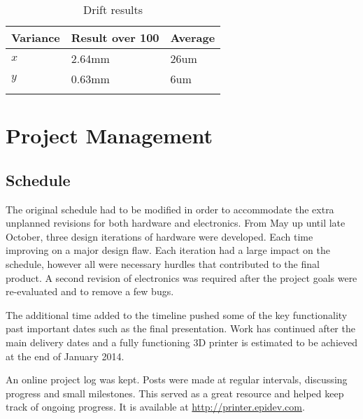 \documentclass[a4paper, 11pt, twoside]{Thesis}  %
\begin{document}
\begin{table}[!h]
\centering
\begin{tabulary}{\textwidth}{LLL}
\hline\hline
 Variance  &  Result over 100  &  Average \\
\hline
\hline
 $x$       &  2.64mm           &  26um    \\
 $y$       &  0.63mm           &  6um     \\
\\
\end{tabulary}
\caption{	Drift results}
\label{1}
\end{table}

\chapter{Project Management}
\label{Project Management}

\section{Schedule}

The original schedule had to be modified in order to accommodate the extra unplanned revisions for both hardware and electronics. From May up until late October, three design iterations of hardware were developed. Each time improving on a major design flaw. Each iteration had a large impact on the schedule, however all were necessary hurdles that contributed to the final product. A second revision of electronics was required after the project goals were re-evaluated and to remove a few bugs.

The additional time added to the timeline pushed some of the key functionality past important dates such as the final presentation. Work has continued after the main delivery dates and a fully functioning 3D printer is estimated to be achieved at the end of January 2014.


An online project log was kept. Posts were made at regular intervals, discussing progress and small milestones. This served as a great resource and helped keep track of ongoing progress. It is available at \href{http://printer.epidev.com}{http://printer.epidev.com}.
\end{document}
